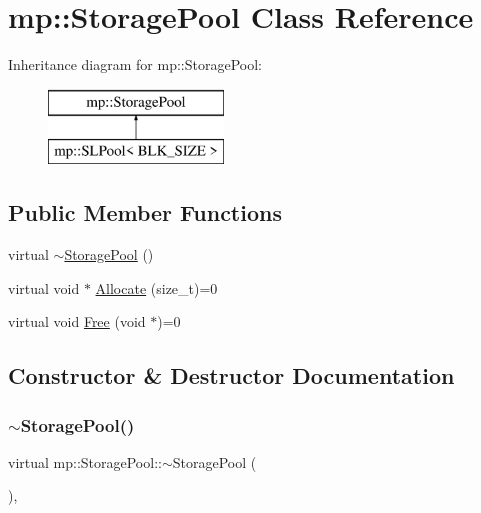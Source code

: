 \hypertarget{classmp_1_1_storage_pool}{}\section{mp\+:\+:Storage\+Pool Class Reference}
\label{classmp_1_1_storage_pool}
Inheritance diagram for mp\+:\+:Storage\+Pool\+:\begin{figure}[H]
\begin{center}
\leavevmode
\includegraphics[height=2.000000cm]{classmp_1_1_storage_pool}
\end{center}
\end{figure}
\subsection*{Public Member Functions}
\begin{DoxyCompactItemize}
\item 
virtual \hyperlink{classmp_1_1_storage_pool_a832cd1b08193b04194adb81d0eea7ca3}{$\sim$\+Storage\+Pool} ()
\item 
virtual void $\ast$ \hyperlink{classmp_1_1_storage_pool_a7970f46f34c0e532544888ecaf10b4c9}{Allocate} (size\+\_\+t)=0
\item 
virtual void \hyperlink{classmp_1_1_storage_pool_a5a186404980f6c958a30373f810ebd4f}{Free} (void $\ast$)=0
\end{DoxyCompactItemize}


\subsection{Constructor \& Destructor Documentation}
\mbox{\label{classmp_1_1_storage_pool_a832cd1b08193b04194adb81d0eea7ca3}} 
\subsubsection{\texorpdfstring{$\sim$\+Storage\+Pool()}{~StoragePool()}}
{\footnotesize\ttfamily virtual mp\+::\+Storage\+Pool\+::$\sim$\+Storage\+Pool (\begin{DoxyParamCaption}{ }\end{DoxyParamCaption})\hspace{0.3cm}{\ttfamily [inline]}, {\ttfamily [virtual]}}



